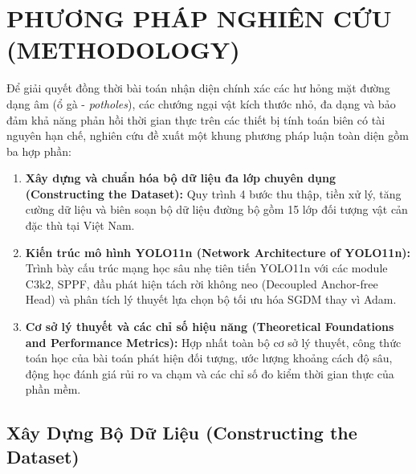 
\section{PHƯƠNG PHÁP NGHIÊN CỨU (METHODOLOGY)}
\label{sec:methodology}

Để giải quyết đồng thời bài toán nhận diện chính xác các hư hỏng mặt đường dạng âm (ổ gà - \textit{potholes}), các chướng ngại vật kích thước nhỏ, đa dạng và bảo đảm khả năng phản hồi thời gian thực trên các thiết bị tính toán biên có tài nguyên hạn chế, nghiên cứu đề xuất một khung phương pháp luận toàn diện gồm ba hợp phần:
\begin{enumerate}
    \item \textbf{Xây dựng và chuẩn hóa bộ dữ liệu đa lớp chuyên dụng (Constructing the Dataset):} Quy trình 4 bước thu thập, tiền xử lý, tăng cường dữ liệu và biên soạn bộ dữ liệu đường bộ gồm 15 lớp đối tượng vật cản đặc thù tại Việt Nam.
    \item \textbf{Kiến trúc mô hình YOLO11n (Network Architecture of YOLO11n):} Trình bày cấu trúc mạng học sâu nhẹ tiên tiến YOLO11n với các module C3k2, SPPF, đầu phát hiện tách rời không neo (Decoupled Anchor-free Head) và phân tích lý thuyết lựa chọn bộ tối ưu hóa SGDM thay vì Adam.
    \item \textbf{Cơ sở lý thuyết và các chỉ số hiệu năng (Theoretical Foundations and Performance Metrics):} Hợp nhất toàn bộ cơ sở lý thuyết, công thức toán học của bài toán phát hiện đối tượng, ước lượng khoảng cách độ sâu, động học đánh giá rủi ro va chạm và các chỉ số đo kiểm thời gian thực của phần mềm.
\end{enumerate}

\subsection{Xây Dựng Bộ Dữ Liệu (Constructing the Dataset)}
\label{subsec:xay_dung_du_lieu}

